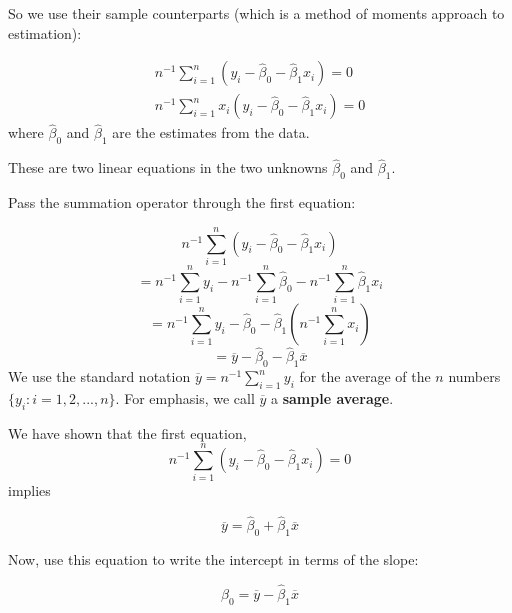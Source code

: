 \documentclass[notes=show]{beamer}
\begin{document}
\begin{frame}[plain]
 So we use their sample counterparts (which is a method of moments approach to estimation):

 \begin{eqnarray*}
  n^{-1}\sum_{i=1}^{n}(y_{i}-\hat{\beta}_{0}-\hat{\beta}_{1}x_{i}) =0 \\
  n^{-1}\sum_{i=1}^{n}x_{i}(y_{i}-\hat{\beta}_{0}-\hat{\beta}_{1}x_{i}) =0
 \end{eqnarray*}
 where $\hat{\beta}_{0}$ and $\hat{\beta}_{1}$ are the estimates from the data.

 These are two linear equations in the two unknowns $\hat{\beta}_{0}$ and $\hat{\beta}_{1}$.
\end{frame}

\begin{frame}[plain]
 Pass the summation operator through the first equation:

 \begin{equation}
  n^{-1}\sum_{i=1}^{n}(y_{i}-\hat{\beta}_{0}-\hat{\beta}_{1}x_{i})
 \end{equation}
 \begin{equation}
  =n^{-1}\sum_{i=1}^{n}y_{i}-n^{-1}\sum_{i=1}^{n}\hat{\beta}_{0}-n^{-1}\sum_{i=1}^{n}\hat{\beta}_{1}x_{i}
 \end{equation}
 \begin{equation}
  =n^{-1}\sum_{i=1}^{n}y_{i}-\hat{\beta}_{0}-\hat{\beta}_{1}\left(n^{-1}\sum_{i=1}^{n}x_{i}\right)
 \end{equation}
 \begin{equation}
  =\overline{y}-\hat{\beta}_{0}-\hat{\beta}_{1}\overline{x}
 \end{equation}
 We use the standard notation $\overline{y}=n^{-1}\sum_{i=1}^{n}y_{i}$ for the average of the $n$ numbers $\{y_{i}:i=1,2,...,n\}$. For emphasis, we call $\overline{y}$ a \textbf{sample average}.

\end{frame}

\begin{frame}[plain]
 We have shown that the first equation,
 \begin{equation}
  n^{-1}\sum_{i=1}^{n}(y_{i}-\hat{\beta}_{0}-\hat{\beta}_{1}x_{i})=0
 \end{equation}
implies

 \begin{equation}
  \overline{y}=\hat{\beta}_{0}+\hat{\beta}_{1}\overline{x}
 \end{equation}

 Now, use this equation to write the intercept in terms of the slope:

 \begin{equation}
  \hat{\beta}_{0}=\overline{y}-\hat{\beta}_{1}\overline{x}
 \end{equation}

\end{frame}
\end{document}
